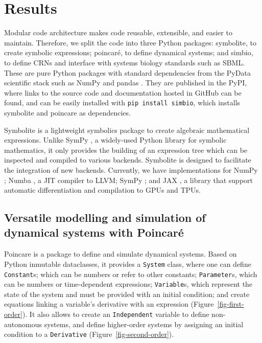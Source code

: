 \documentclass[namedate,numsec,webpdf,modern,large]{oup-authoring-template}
\theoremstyle{thmstyleone}%
\theoremstyle{thmstyletwo}%
\theoremstyle{thmstylethree}%
\begin{document}
\section{Results}\label{results}

Modular code architecture makes code reusable, extensible, and easier to maintain.
Therefore, we split the code into three Python packages:
symbolite, to create symbolic expressions;
poincaré, to define dynamical systems;
and simbio, to define \acp{CRN} and interface with systems biology standards such as \ac{SBML}.
These are pure Python packages with standard dependencies from the PyData scientific stack
such as NumPy \cite{harrisArrayProgrammingNumPy2020} and pandas \cite{mckinneyDataStructuresStatistical2010}.
They are published in the \acf{PyPI},
where links to the source code and documentation hosted in GitHub can be found,
and can be easily installed with \texttt{pip\ install\ simbio},
which installs symbolite and poincare as dependencies.

Symbolite is a lightweight symbolics package to create algebraic mathematical expressions.
Unlike SymPy \cite{meurerSymPySymbolicComputing2017},
a widely-used Python library for symbolic mathematics,
it only provides the building of an expression tree
which can be inspected and compiled to various backends.
Symbolite is designed to facilitate the integration of new backends.
Currently, we have implementations for
NumPy \cite{harrisArrayProgrammingNumPy2020};
Numba \cite{lamNumbaLLVMbasedPython2015},
a \ac{JIT} compiler to LLVM;
SymPy \cite{meurerSymPySymbolicComputing2017};
and JAX \cite{jax2018github}, a
library that support automatic differentiation and compilation to \acp{GPU} and \acp{TPU}.

\subsection{Versatile modelling and simulation of dynamical systems with Poincaré}
\label{versatile-modelling-and-simulation-of-dynamical-systems-with-poincaruxe9}

Poincare is a package to define and simulate dynamical systems.
Based on Python inmutable dataclasses,
it provides a \texttt{System} class,
where one can define
\texttt{Constant}s; which can be numbers or refer to other constants;
\texttt{Parameter}s, which can be numbers or time-dependent expressions;
\texttt{Variable}s, which represent the state of the system and must be provided with an initial condition;
and create equations linking a variable's derivative with an expression (Figure~\ref{fig-first-order}).
It also allows to
create an \texttt{Independent} variable to define non-autonomous systems,
and define higher-order systems by assigning an initial condition to a \texttt{Derivative} (Figure~\ref{fig-second-order}).
\end{document}
